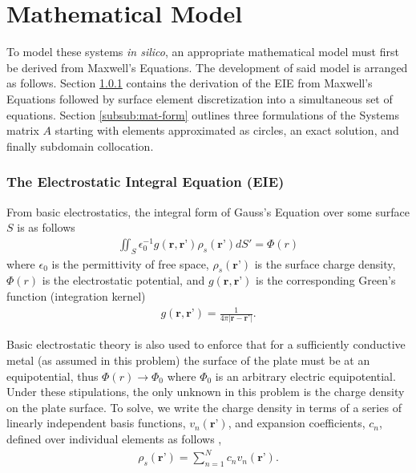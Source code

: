 \section{Mathematical Model}
\label{sec:mathmod}

To model these systems \textit{in silico}, an appropriate mathematical model must first be derived from Maxwell's Equations. The development of said model is arranged as follows. Section \ref{subsub:eie} contains the derivation of the EIE from Maxwell's Equations followed by surface element discretization into a simultaneous set of equations. Section \ref{subsub:mat-form} outlines three formulations of the Systems matrix $A$ starting with elements approximated as circles, an exact solution, and finally subdomain collocation. 

\subsubsection{The Electrostatic Integral Equation (EIE)}
\label{subsub:eie}
From basic electrostatics, the integral form of Gauss's Equation over some surface $S$ is as follows
\begin{align}
    \iint_S\epsilon_0^{-1}g(\textbf{r},\textbf{r'})\rho_s(\textbf{r'})dS'=\Phi(r)
    \label{eq:Gauss}
\end{align}
where $\epsilon_0$ is the permittivity of free space, $\rho_s(\textbf{r'})$ is the surface charge density, $\Phi(r)$ is the electrostatic potential, and $g(\textbf{r},\textbf{r'})$ is the corresponding Green's function (integration kernel)
\begin{align}
    g(\textbf{r},\textbf{r'})=\frac{1}{4\pi|\textbf{r}-\textbf{r'}|}.
    \label{eq:greemn}
\end{align}

Basic electrostatic theory is also used to enforce that for a sufficiently conductive metal (as assumed in this problem) the surface of the plate must be at an equipotential, thus $\Phi(r)\rightarrow\Phi_0$ where $\Phi_0$ is an arbitrary electric equipotential. Under these stipulations, the only unknown in this problem is the charge density on the plate surface. To solve, we write the charge density in terms of a series of linearly independent basis functions, $v_n(\textbf{r'})$, and expansion coefficients, $c_n$, defined over individual elements as follows \cite{rothlecnotes}, \cite{jin2011theory}
\begin{align}
    \rho_s(\textbf{r'})=\sum_{n=1}^{N}c_nv_n(\textbf{r'}).
    \label{eq:rho_expansion}
\end{align}


